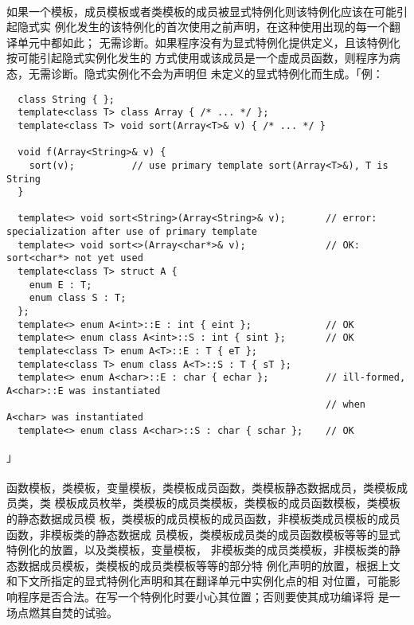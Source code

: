 \paragraph{}
如果一个模板，成员模板或者类模板的成员被显式特例化则该特例化应该在可能引起隐式实
例化发生的该特例化的首次使用之前声明，在这种使用出现的每一个翻译单元中都如此；
无需诊断。如果程序没有为显式特例化提供定义，且该特例化按可能引起隐式实例化发生的
方式使用或该成员是一个虚成员函数，则程序为病态，无需诊断。隐式实例化不会为声明但
未定义的显式特例化而生成。「例：
\begin{lstlisting}
  class String { };
  template<class T> class Array { /* ... */ };
  template<class T> void sort(Array<T>& v) { /* ... */ }

  void f(Array<String>& v) {
    sort(v);          // use primary template sort(Array<T>&), T is String
  }

  template<> void sort<String>(Array<String>& v);       // error: specialization after use of primary template
  template<> void sort<>(Array<char*>& v);              // OK: sort<char*> not yet used
  template<class T> struct A {
    enum E : T;
    enum class S : T;
  };
  template<> enum A<int>::E : int { eint };             // OK
  template<> enum class A<int>::S : int { sint };       // OK
  template<class T> enum A<T>::E : T { eT };
  template<class T> enum class A<T>::S : T { sT };
  template<> enum A<char>::E : char { echar };          // ill-formed, A<char>::E was instantiated
                                                        // when A<char> was instantiated
  template<> enum class A<char>::S : char { schar };    // OK
\end{lstlisting}」

\paragraph{}
函数模板，类模板，变量模板，类模板成员函数，类模板静态数据成员，类模板成员类，类
模板成员枚举，类模板的成员类模板，类模板的成员函数模板，类模板的静态数据成员模
板，类模板的成员模板的成员函数，非模板类成员模板的成员函数，非模板类的静态数据成
员模板，类模板成员类的成员函数模板等等的显式特例化的放置，以及类模板，变量模板，
非模板类的成员类模板，非模板类的静态数据成员模板，类模板的成员类模板等等的部分特
例化声明的放置，根据上文和下文所指定的显式特例化声明和其在翻译单元中实例化点的相
对位置，可能影响程序是否合法。在写一个特例化时要小心其位置；否则要使其成功编译将
是一场点燃其自焚的试验。

